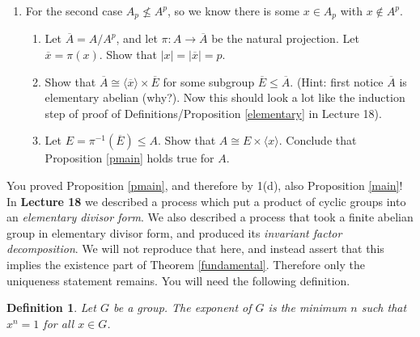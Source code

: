 \documentclass[11pt]{article}
\newtheorem{definition}[theorem]{Definition}
\newcommand{\la}{\langle}
\newcommand{\ra}{\rangle}
\begin{document}
\begin{enumerate}
{\begin{enumerate}
{\begin{enumerate}
{      }
      \item{
      Show that $A^p\unlhd A_0$ and that $A_0/A^p$ is an elementary abelian group of order $p^t$.
      }
      \item{
      Use part (c) and (d)(iii) to show that $|A_0| = |A|$.  Conclude that Proposition \ref{pmain} holds for $A$.
      }
    \end{enumerate}
    }
    \item{
    For the second case $A_p\not\le A^p$, so we know there is some $x\in A_p$ with $x\notin A^p$.
    \begin{enumerate}
      \item{
      Let $\overline A = A/A^p$, and let $\pi:A\to \overline A$ be the natural projection.  Let $\overline x = \pi(x)$.  Show that $|x| = |\overline x| = p$.
      }
      \item{
      Show that $\overline A\cong \la\overline x\ra\times\overline E$ for some subgroup $\overline E\le \overline A$.  (Hint: first notice $\overline A$ is elementary abelian (why?).  Now this should look a lot like the induction step of proof of Definitions/Proposition \ref{elementary} in Lecture 18).
      }
      \item{
      Let $E = \pi^{-1}(\overline E)\le A$.  Show that $A\cong E\times\la x\ra$.  Conclude that Proposition \ref{pmain} holds true for $A$.
      }
    \end{enumerate}
    }
  \end{enumerate}
  }
\end{enumerate}
You proved Proposition \ref{pmain}, and therefore by 1(d), also Proposition \ref{main}!  In \textbf{Lecture 18} we described a process which put a product of cyclic groups into an \textit{elementary divisor form}.  We also described a process that took a finite abelian group in elementary divisor form, and produced its \textit{invariant factor decomposition}.  We will not reproduce that here, and instead assert that this implies the existence part of Theorem \ref{fundamental}.  Therefore only the uniqueness statement remains.  You will need the following definition.
\begin{definition}
  Let $G$ be a group.  The \textit{exponent} of $G$ is the minimum $n$ such that $x^n=1$ for all $x\in G$.
\end{definition}
\end{document}
